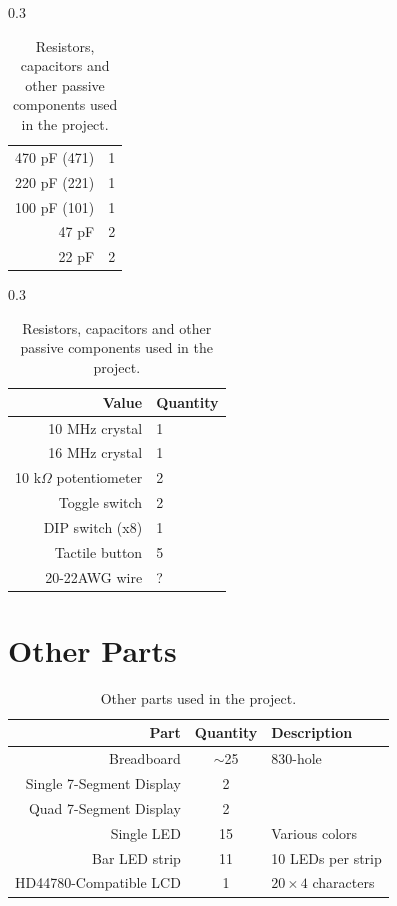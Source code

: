 \begin{table}[H]
\begin{subtable}[t]{0.3\textwidth}
\begin{tabular}{r|l}
      470 pF (471)             & 1 \\
      220 pF (221)             & 1 \\
      100 pF (101)             & 1 \\    
      47 pF                    & 2  \\    
      22 pF                    & 2  \\    
    \end{tabular}
    \caption{Capacitors}
  \end{subtable}
  \hfill
  \begin{subtable}[t]{0.3\textwidth}
    \vspace{0pt}
    \begin{tabular}{r|l}
      Value                      & Quantity \\ \hline
      10 MHz crystal             & 1 \\    
      16 MHz crystal             & 1 \\
      10 k$\Omega$ potentiometer & 2 \\
      Toggle switch              & 2 \\
      DIP switch (x8)            & 1 \\
      Tactile button             & 5 \\
      20-22AWG wire              & ? \\
    \end{tabular}
    \caption{Other passive components}
  \end{subtable}

  \caption{Resistors, capacitors and other passive components used in the project.}
  \label{tab:rcbom}
\end{table}


\section{Other Parts}
\begin{table}[H]
  \centering
  \begin{tabular}{r|c|l}
    Part                     & Quantity & Description \\\hline
    Breadboard               & $\sim$25 & 830-hole  \\
    Single 7-Segment Display & 2 &    \\
    Quad 7-Segment Display   & 2 &    \\
    Single LED               & 15 & Various colors \\
    Bar LED strip            & 11 & 10 LEDs per strip  \\
    HD44780-Compatible LCD   & 1 & $20\times4$ characters  \\
  \end{tabular}
  \caption{Other parts used in the project.}
  \label{tab:otherparts}
\end{table}

